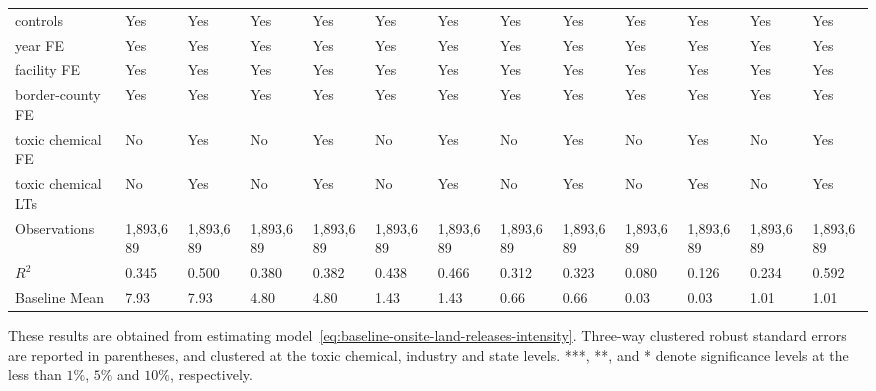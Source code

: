 \begin{table}[H]
{\begin{tabular}{@{}lllllllllllll@{}}
            controls           & Yes       & Yes       & Yes       & Yes       & Yes       & Yes       & Yes       & Yes       & Yes       & Yes       & Yes       & Yes       \\
            year FE            & Yes       & Yes       & Yes       & Yes       & Yes       & Yes       & Yes       & Yes       & Yes       & Yes       & Yes       & Yes       \\
            facility FE        & Yes       & Yes       & Yes       & Yes       & Yes       & Yes       & Yes       & Yes       & Yes       & Yes       & Yes       & Yes       \\
            border-county FE   & Yes       & Yes       & Yes       & Yes       & Yes       & Yes       & Yes       & Yes       & Yes       & Yes       & Yes       & Yes       \\
            toxic chemical FE  & No        & Yes       & No        & Yes       & No        & Yes       & No        & Yes       & No        & Yes       & No        & Yes       \\
            toxic chemical LTs & No        & Yes       & No        & Yes       & No        & Yes       & No        & Yes       & No        & Yes       & No        & Yes       \\\midrule
            Observations       & 1,893,689 & 1,893,689 & 1,893,689 & 1,893,689 & 1,893,689 & 1,893,689 & 1,893,689 & 1,893,689 & 1,893,689 & 1,893,689 & 1,893,689 & 1,893,689 \\
            $R^2$              & 0.345     & 0.500     & 0.380     & 0.382     & 0.438     & 0.466     & 0.312     & 0.323     & 0.080     & 0.126     & 0.234     & 0.592     \\
            Baseline Mean      & 7.93      & 7.93      & 4.80      & 4.80      & 1.43      & 1.43      & 0.66      & 0.66      & 0.03      & 0.03      & 1.01      & 1.01      \\ \bottomrule\bottomrule
        \end{tabular}%
    }
    \begin{minipage}{18cm}
        \vspace{0.05in}
        These results are obtained from estimating model~\ref{eq:baseline-onsite-land-releases-intensity}. Three-way clustered robust standard errors are reported in parentheses, and clustered at the toxic chemical, industry and state levels. ***, **, and * denote significance levels at the less than $1\%$, $5\%$ and $10\%$, respectively.
    \end{minipage}
\end{table}